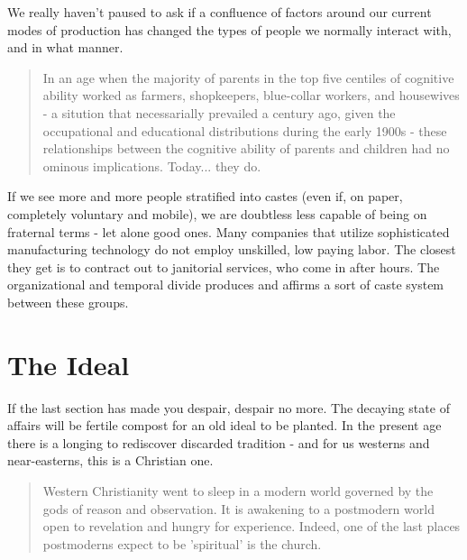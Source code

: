 \documentclass[letterpaper]{article}
\begin{document}

We really haven't paused to ask if a confluence of factors around our current modes of production has changed the types of people we normally interact with, and in what manner.

\begin{quote}
  In an age when the majority of parents in the top five centiles of cognitive ability worked as farmers, shopkeepers, blue-collar workers, and housewives - a sitution that necessarially prevailed a century ago, given the occupational and educational distributions during the early 1900s - these relationships between the cognitive ability of parents and children had no ominous implications. Today... they do.
\end{quote}

If we see more and more people stratified into castes (even if, on paper, completely voluntary and mobile), we are doubtless less capable of being on fraternal terms - let alone good ones. Many companies that utilize sophisticated manufacturing technology do not employ unskilled, low paying labor. The closest they get is to contract out to janitorial services, who come in after hours. The organizational and temporal divide produces and affirms a sort of caste system between these groups.


\section{The Ideal}


If the last section has made you despair, despair no more. The decaying state of affairs will be fertile compost for an old ideal to be planted. In the present age there is a longing to rediscover discarded tradition - and for us westerns and near-easterns, this is a Christian one.

\begin{quote}
  Western Christianity went to sleep in a modern world governed by the gods of reason and observation. It is awakening to a postmodern world open to revelation and hungry for experience. Indeed, one of the last places postmoderns expect to be 'spiritual' is the church.
\end{quote}
\end{document}
